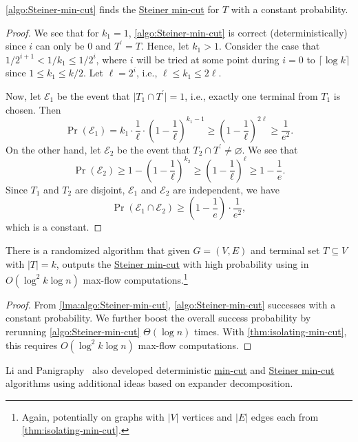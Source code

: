 \begin{lemma}\label{lma:algo:Steiner-min-cut}
	\autoref{algo:Steiner-min-cut} finds the \hyperref[prb:Steiner-min-cut]{Steiner min-cut} for \(T\) with a constant probability.
\end{lemma}
\begin{proof}
	We see that for \(k_1 = 1\), \autoref{algo:Steiner-min-cut} is correct (deterministically) since \(i\) can only be \(0\) and \(T^{\prime} = T\). Hence, let \(k_1 > 1\). Consider the case that \(1 / 2^{i+1} < 1 / k_1 \leq 1 / 2^i\), where \(i\) will be tried at some point during \(i=0\) to \(\lceil \log k \rceil \) since \(1 \leq k_1 \leq k / 2\). Let \(\ell = 2^i\), i.e., \(\ell \leq k_1 \leq 2 \ell \).

	Now, let \(\mathcal{E} _1\) be the event that \(\lvert T_1 \cap T^{\prime} \rvert = 1\), i.e., exactly one terminal from \(T_1\) is chosen. Then
	\[
		\Pr(\mathcal{E} _1)
		= k_1 \cdot \frac{1}{\ell } \cdot \left( 1 - \frac{1}{\ell } \right) ^{k_1 - 1}
		\geq \left( 1 - \frac{1}{\ell } \right) ^{2\ell }
		\geq \frac{1}{e^2}.
	\]
	On the other hand, let \(\mathcal{E} _2\) be the event that \(T_2 \cap T^{\prime} \neq \varnothing \). We see that
	\[
		\Pr(\mathcal{E} _2)
		\geq 1 - \left( 1 - \frac{1}{\ell } \right) ^{k_2}
		\geq \left( 1 - \frac{1}{\ell } \right) ^{\ell }
		\geq 1 - \frac{1}{e}.
	\]
	Since \(T_1\) and \(T_2\) are disjoint, \(\mathcal{E} _1\) and \(\mathcal{E} _2\) are independent, we have
	\[
		\Pr(\mathcal{E} _1 \cap \mathcal{E} _2)
		\geq \left( 1 - \frac{1}{e} \right) \cdot \frac{1}{e^2},
	\]
	which is a constant.
\end{proof}

\begin{theorem}
	There is a randomized algorithm that given \(G=(V, E)\) and terminal set \(T \subseteq V\) with \(\lvert T \rvert = k\), outputs the \hyperref[prb:Steiner-min-cut]{Steiner min-cut} with high probability using in \(O(\log^2 k \log n)\) max-flow computations.\footnote{Again, potentially on graphs with \(\lvert V \rvert \) vertices and \(\lvert E \rvert \) edges each from \autoref{thm:isolating-min-cut}.}
\end{theorem}
\begin{proof}
	From \autoref{lma:algo:Steiner-min-cut}, \autoref{algo:Steiner-min-cut} successes with a constant probability. We further boost the overall success probability by rerunning \autoref{algo:Steiner-min-cut} \(\Theta (\log n)\) times. With \autoref{thm:isolating-min-cut}, this requires \(O(\log ^2k \log n)\) max-flow computations.
\end{proof}

\begin{remark}
	Li and Panigraphy~\cite{li2020deterministic} also developed deterministic \hyperref[prb:global-min-cut]{min-cut} and \hyperref[prb:Steiner-min-cut]{Steiner min-cut} algorithms using additional ideas based on expander decomposition.
\end{remark}